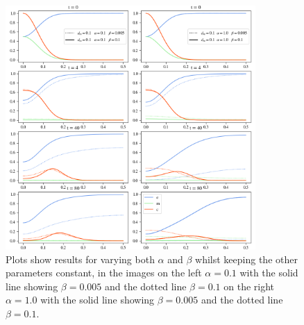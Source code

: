 \begin{figure}[h]
    \centering
    \includegraphics[width=0.85\textwidth]{resources/images/dm_alpha_beta_variation_2.png}
    \caption{Plots show results for varying both $\alpha$ and $\beta$ whilst keeping the other parameters constant, in the images on the left $\alpha=0.1$ with the solid line showing $\beta = 0.005$ and the dotted line $\beta=0.1$ on the right $\alpha=1.0$ with the solid line showing $\beta = 0.005$ and the dotted line $\beta=0.1$.}
    \label{fig:dm_alpha_beta_variation_2}
\end{figure}

